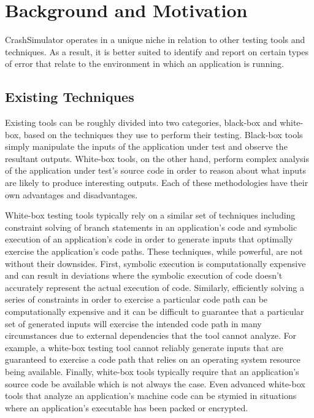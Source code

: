 \section{Background and Motivation}

    CrashSimulator operates in a unique niche in relation to other testing tools and techniques. As a result, it is
    better suited to identify and report on certain types of error that relate to the environment in which an
    application is running.

    \subsection{Existing Techniques}

        Existing tools can be roughly divided into two categories, black-box and white-box, based on the techniques they
        use to perform their testing. Black-box tools simply manipulate the inputs of the application under test and
        observe the resultant outputs. White-box tools, on the other hand, perform complex analysis of the application
        under test's source code in order to reason about what inputs are likely to produce interesting outputs. Each of
        these methodologies have their own advantages and disadvantages.

        White-box testing tools typically rely on a similar set of techniques including constraint solving of branch
        statements in an application's code and symbolic execution of an application's code in order to generate inputs
        that optimally exercise the application's code paths. These techniques, while powerful, are not without their
        downsides.  First, symbolic execution is computationally expensive and can result in deviations where the
        symbolic execution of code doesn't accurately represent the actual execution of code.  Similarly, efficiently
        solving a series of constraints in order to exercise a particular code path can be computationally expensive and
        it can be difficult to guarantee that a particular set of generated inputs will exercise the intended code path
        in many circumstances due to external dependencies that the tool cannot analyze. For example, a white-box
        testing tool cannot reliably generate inputs that are guaranteed to exercise a code path that relies on an
        operating system resource being available. Finally, white-box tools typically require that an application's
        source code be available which is not always the case. Even advanced white-box tools that analyze an
        application's machine code can be stymied in situations where an application's executable has been packed or
        encrypted.


